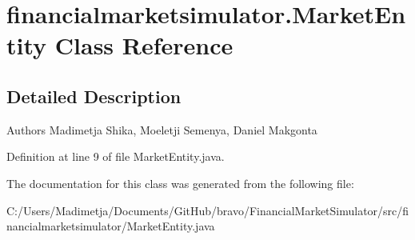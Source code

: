 \hypertarget{classfinancialmarketsimulator_1_1_market_entity}{\section{financialmarketsimulator.\+Market\+Entity Class Reference}
\label{classfinancialmarketsimulator_1_1_market_entity}
}


\subsection{Detailed Description}
\begin{DoxyAuthor}{Authors}
Madimetja Shika, Moeletji Semenya, Daniel Makgonta 
\end{DoxyAuthor}


Definition at line 9 of file Market\+Entity.\+java.



The documentation for this class was generated from the following file\+:\begin{DoxyCompactItemize}
\item 
C\+:/\+Users/\+Madimetja/\+Documents/\+Git\+Hub/bravo/\+Financial\+Market\+Simulator/src/financialmarketsimulator/Market\+Entity.\+java\end{DoxyCompactItemize}
